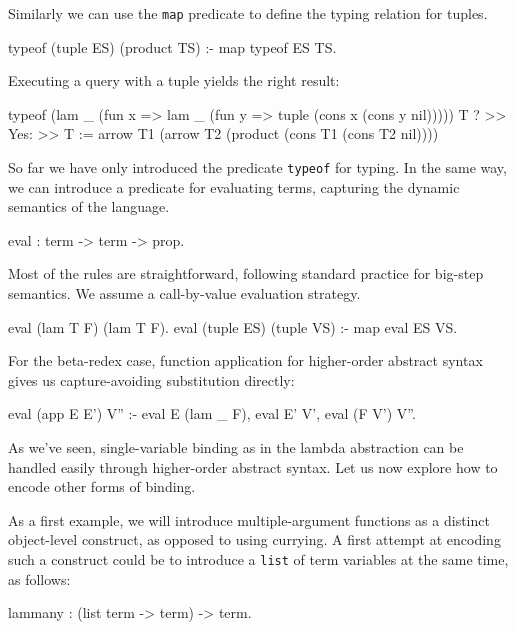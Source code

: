 \documentclass[format=acmlarge,review,anonymous]{acmart}\settopmatter{printfolios=true}
\begin{document}
Similarly we can use the \texttt{map} predicate to define the typing relation for tuples. 

\begin{codequote}
typeof (tuple ES) (product TS) :-
  map typeof ES TS.
\end{codequote}

Executing a query with a tuple yields the right result:

\begin{codequote}
typeof (lam _ (fun x => lam _ (fun y => tuple (cons x (cons y nil))))) T ?
>> Yes:
>> T := arrow T1 (arrow T2 (product (cons T1 (cons T2 nil))))
\end{codequote}

So far we have only introduced the predicate \texttt{typeof} for typing. In the same way, we can introduce
a predicate for evaluating terms, capturing the dynamic semantics of the language.

\begin{codequote}
eval : term -> term -> prop.
\end{codequote}

Most of the rules are straightforward, following standard practice for big-step semantics.  We
assume a call-by-value evaluation strategy.

\begin{codequote}
eval (lam T F) (lam T F).
eval (tuple ES) (tuple VS) :- map eval ES VS.
\end{codequote}

For the beta-redex case, function application for higher-order abstract syntax gives us
capture-avoiding substitution directly:

\begin{codequote}
eval (app E E') V'' :-
  eval E (lam _ F), eval E' V', eval (F V') V''.
\end{codequote}


As we've seen, single-variable binding as in the lambda abstraction can
be handled easily through higher-order abstract syntax. Let us now
explore how to encode other forms of binding.

As a first example, we will introduce multiple-argument functions as a
distinct object-level construct, as opposed to using currying. A first
attempt at encoding such a construct could be to introduce a
\texttt{list} of term variables at the same time, as follows:

\begin{codequote}
lammany : (list term -> term) -> term.
\end{codequote}
\end{document}
